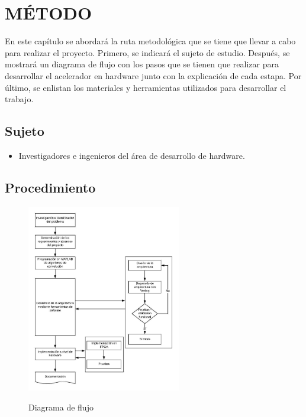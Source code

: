 \renewcommand\thechapter{\Roman{chapter}}
\chapter{MÉTODO} \label{ch:metodo} \thispagestyle{fancy}
\renewcommand\thechapter{\arabic{chapter}}
En este capítulo se abordará la ruta metodológica que se tiene que llevar a cabo para realizar el proyecto. Primero, se indicará el sujeto de estudio. Después, se mostrará un diagrama de flujo con los pasos que se tienen que realizar para desarrollar el acelerador en hardware junto con la explicación de cada estapa. Por último, se enlistan los materiales y herramientas utilizados para desarrollar el trabajo.


\section{Sujeto}
\begin{itemize}
\item Investigadores e ingenieros del área de desarrollo de hardware. 
\end{itemize}

\section{Procedimiento}

\begin{figure}[!h]
\centering
\includegraphics[width=0.6\textwidth, height=0.8\textheight]{./figs/procedimiento}\\
\caption{Diagrama de flujo}
\label{diagramaflujo}
\end{figure}

